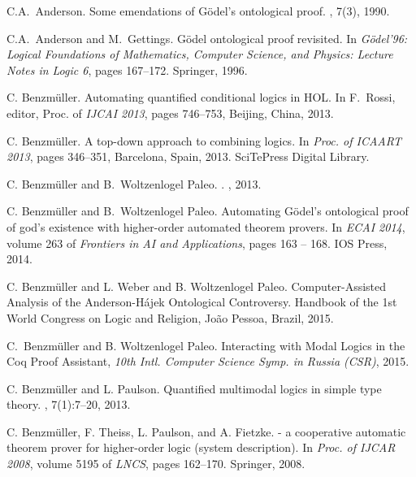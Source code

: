 \documentclass{llncs}
\begin{document}
\begin{thebibliography}{10}

C.A.~Anderson.
\newblock Some emendations of {G{\"o}del's} ontological proof.
, 7(3), 1990.


C.A.~Anderson and M.~Gettings.
\newblock G\"odel ontological proof revisited.
\newblock In {\em {G\"odel'96: Logical Foundations of Mathematics, Computer
  Science, and Physics: Lecture Notes in Logic 6}}, pages 167--172. {Springer},
  1996.


C. Benzm{\"u}ller.
\newblock Automating quantified conditional logics in {HOL}.
\newblock In F.~Rossi, editor, Proc. of {\em IJCAI 2013}, pages 746--753, Beijing, China, 2013.

C. Benzm{\"u}ller.
\newblock A top-down approach to combining logics.
\newblock In {\em Proc. of ICAART 2013}, pages 346--351, Barcelona, Spain, 2013.
  SciTePress Digital Library.

C. Benzm\"uller and B.~Woltzenlogel Paleo.
.
, 2013.

C. Benzm{\"u}ller and B.~Woltzenlogel Paleo.
\newblock Automating {G\"{o}del's} ontological proof of god's existence with
  higher-order automated theorem provers.
\newblock In 
  {\em ECAI 2014}, volume 263 of {\em Frontiers in AI and
  Applications}, pages 163 -- 168. IOS Press, 2014.

C. Benzm{\"u}ller and L. Weber and B. Woltzenlogel
Paleo. Computer-Assisted Analysis of the {Anderson-H\'{a}jek}
Ontological Controversy. Handbook of the 1st World Congress on Logic
and Religion, Jo\~ao Pessoa, Brazil, 2015.

C.~Benzm{\"u}ller and B. Woltzenlogel Paleo.
\newblock Interacting with Modal Logics in the Coq Proof Assistant,
{\em 10th Intl. Computer Science Symp. in Russia (CSR)}, 2015.

C. Benzm{\"u}ller and L. Paulson.
\newblock Quantified multimodal logics in simple type theory.
,
  7(1):7--20, 2013.

C. Benzm{\"u}ller, F. Theiss, L. Paulson, and A. Fietzke.
 - a cooperative automatic theorem prover for higher-order
  logic (system description).
\newblock In 
  {\em Proc. of IJCAR 2008}, volume 5195 of {\em
  LNCS}, pages 162--170. Springer, 2008.


\end{thebibliography}
\end{document}
